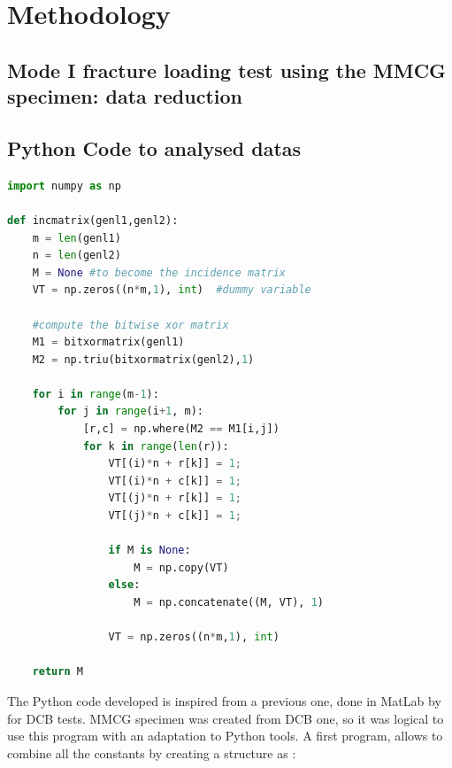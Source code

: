\chapter{Methodology}
\label{Method}

\section{Mode I fracture loading test using the MMCG specimen: data reduction}

\section{Python Code to analysed datas}

\begin{lstlisting}[language=Python]
import numpy as np

def incmatrix(genl1,genl2):
    m = len(genl1)
    n = len(genl2)
    M = None #to become the incidence matrix
    VT = np.zeros((n*m,1), int)  #dummy variable

    #compute the bitwise xor matrix
    M1 = bitxormatrix(genl1)
    M2 = np.triu(bitxormatrix(genl2),1)

    for i in range(m-1):
        for j in range(i+1, m):
            [r,c] = np.where(M2 == M1[i,j])
            for k in range(len(r)):
                VT[(i)*n + r[k]] = 1;
                VT[(i)*n + c[k]] = 1;
                VT[(j)*n + r[k]] = 1;
                VT[(j)*n + c[k]] = 1;

                if M is None:
                    M = np.copy(VT)
                else:
                    M = np.concatenate((M, VT), 1)

                VT = np.zeros((n*m,1), int)

    return M
\end{lstlisting}



The Python code developed is inspired from a previous one, done in MatLab by \parencite{Reference14} for DCB tests. MMCG specimen was created from DCB one, so it was logical to use this program with an adaptation to Python tools. A first program, allows to combine all the constants by creating a structure as :

